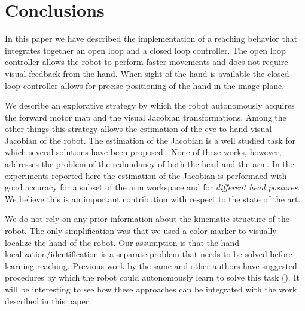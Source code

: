 \section{Conclusions}
In this paper we have described the implementation of a reaching
behavior that integrates together an open loop and a closed 
loop controller. The open loop controller
allows the robot to perform faster movements and does not require visual 
feedback from the hand. When sight of the hand is available the closed
loop controller allows for precise positioning of the hand in the 
image plane. 

We describe an explorative strategy by which the robot autonomously 
acquires the forward motor map and the visual Jacobian transformations. 
Among the other things this strategy 
allows the estimation of the eye-to-hand visual Jacobian of the robot. 
The estimation of the Jacobian is a well studied task for which several 
solutions have been proposed \cite{Hosoda94versatile,Mansard06jacobian,
Lapreste04efficient}. None of these works, however, addresses the 
problem of the redundancy of both the head and the arm. In the experiments 
reported here the estimation of the Jacobian is performaed with good 
accuracy for a subset of the arm workspace and for 
\emph{different head postures}. We believe
this is an important contribution with respect to the state of the art.

We do not rely on any prior information about the 
kinematic structure of the robot. The only simplification was that we used 
a color marker to visually localize the hand of the robot. Our assumption
is that the hand localization/identification is a separate problem
that needs to be solved before learning reaching. Previous work
by the same and other authors have suggested procedures by which 
the robot could autonomously learn to solve this task 
(\cite{Natale05,edsinger06what}). It will be interesting to see
how these approaches can be integrated with the work described 
in this paper.

